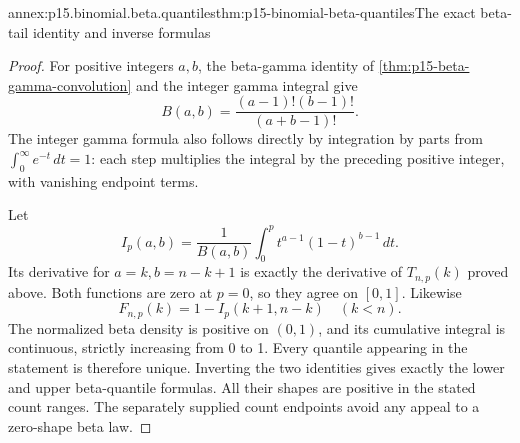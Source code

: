 \begin{annexitem}{annex:p15.binomial.beta.quantiles}{thm:p15-binomial-beta-quantiles}{The exact beta-tail identity and inverse formulas}
\begin{proof}
For positive integers \(a,b\),
the beta-gamma identity of
\cref{thm:p15-beta-gamma-convolution}
and the integer gamma integral
give
\[
                   B(a,b)=\frac{(a-1)!(b-1)!}{(a+b-1)!}.
\]
The integer gamma formula
also follows directly by
integration by parts from
\(\int_0^\infty e^{-t}\,dt=1\):
each step multiplies the
integral by the preceding
positive integer, with
vanishing endpoint terms.

Let
\[
 I_p(a,b)=\frac1{B(a,b)}
                   \int_0^p t^{a-1}(1-t)^{b-1}\,dt.
\]
Its derivative for
\(a=k,b=n-k+1\) is
exactly the derivative
of \(T_{n,p}(k)\)
proved above. Both
functions are zero at
\(p=0\), so they agree
on \([0,1]\).
Likewise
\[
                 F_{n,p}(k)=1-I_p(k+1,n-k)
                                           \quad(k<n).
\]
The normalized beta
density is positive on
\((0,1)\), and its
cumulative integral is
continuous, strictly
increasing from 0 to 1.
Every quantile appearing
in the statement is
therefore unique.
Inverting the two
identities gives exactly
the lower and upper
beta-quantile formulas.
All their shapes are
positive in the stated
count ranges. The
separately supplied
count endpoints avoid
any appeal to a
zero-shape beta law.
\end{proof}
\end{annexitem}


